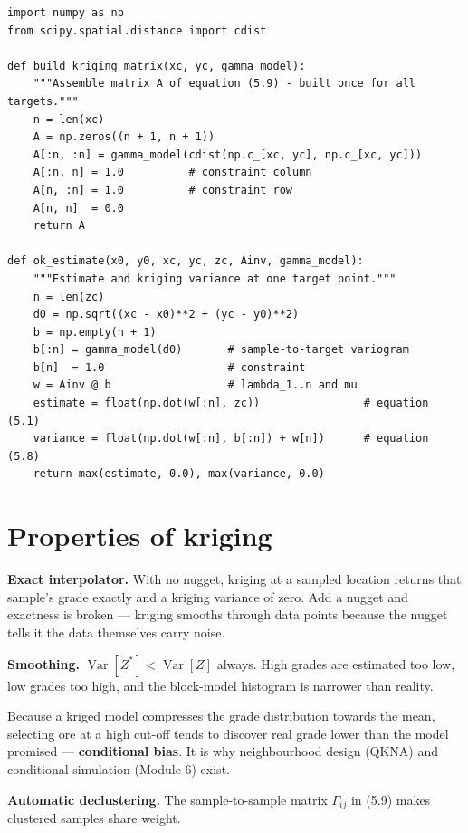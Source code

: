 \documentclass[11pt]{article}
\begin{document}
\begin{lstlisting}
import numpy as np
from scipy.spatial.distance import cdist

def build_kriging_matrix(xc, yc, gamma_model):
    """Assemble matrix A of equation (5.9) - built once for all targets."""
    n = len(xc)
    A = np.zeros((n + 1, n + 1))
    A[:n, :n] = gamma_model(cdist(np.c_[xc, yc], np.c_[xc, yc]))
    A[:n, n] = 1.0          # constraint column
    A[n, :n] = 1.0          # constraint row
    A[n, n]  = 0.0
    return A

def ok_estimate(x0, y0, xc, yc, zc, Ainv, gamma_model):
    """Estimate and kriging variance at one target point."""
    n = len(zc)
    d0 = np.sqrt((xc - x0)**2 + (yc - y0)**2)
    b = np.empty(n + 1)
    b[:n] = gamma_model(d0)       # sample-to-target variogram
    b[n]  = 1.0                   # constraint
    w = Ainv @ b                  # lambda_1..n and mu
    estimate = float(np.dot(w[:n], zc))                # equation (5.1)
    variance = float(np.dot(w[:n], b[:n]) + w[n])      # equation (5.8)
    return max(estimate, 0.0), max(variance, 0.0)
\end{lstlisting}

\section{Properties of kriging}

\textbf{Exact interpolator.} With no nugget, kriging at a sampled
location returns that sample's grade exactly and a kriging variance of
zero. Add a nugget and exactness is broken --- kriging smooths through
data points because the nugget tells it the data themselves carry noise.

\textbf{Smoothing.} $\operatorname{Var}[Z^*]<\operatorname{Var}[Z]$
always. High grades are estimated too low, low grades too high, and the
block-model histogram is narrower than reality.

\begin{pitbox}
Because a kriged model compresses the grade distribution towards the
mean, selecting ore at a high cut-off tends to discover real grade lower
than the model promised --- \textbf{conditional bias}. It is why
neighbourhood design (QKNA) and conditional simulation (Module 6) exist.
\end{pitbox}

\textbf{Automatic declustering.} The sample-to-sample matrix
$\Gamma_{ij}$ in (5.9) makes clustered samples share weight.
\end{document}
